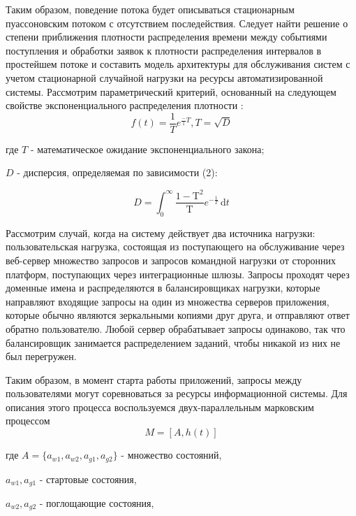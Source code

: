 Таким образом, поведение потока будет описываться стационарным пуассоновским потоком с отсутствием последействия. Следует найти решение о степени приближения плотности распределения времени между событиями поступления и обработки заявок к плотности распределения интервалов в простейшем потоке и составить модель архитектуры для обслуживания систем с учетом стационарной случайной нагрузки на ресурсы автоматизированной системы. 
Рассмотрим параметрический критерий, основанный на следующем свойстве экспоненциального распределения плотности :
\begin{equation}
    \label{eq:equation9}
    f(t) = \frac{1}{T}e^{\frac-{1}{T}}, T = \sqrt{D}
\end{equation}

где $T$ - математическое ожидание экспоненциального закона;

$D$ - дисперсия, определяемая по зависимости (2):

\begin{equation}
    \label{eq:equation10}
    D = \int_0^\infty \mathrm{\frac{{1-T}^2}{T}}{e}^{-\frac{1}{T}}\,\mathrm{d}t
\end{equation}

Рассмотрим случай, когда на систему действует два источника нагрузки: пользовательская нагрузка, состоящая из поступающего на обслуживание через веб-сервер множество запросов и запросов командной нагрузки от сторонних платформ, поступающих через интеграционные шлюзы. Запросы проходят через доменные имена и распределяются в балансировщиках нагрузки, которые направляют входящие запросы на один из множества серверов приложения, которые обычно являются зеркальными копиями друг друга, и отправляют ответ обратно пользователю. Любой сервер обрабатывает запросы одинаково, так что балансировщик занимается распределением заданий, чтобы никакой из них не был перегружен.

Таким образом, в момент старта работы приложений, запросы между пользователями могут соревноваться за ресурсы информационной системы. Для описания этого процесса воспользуемся двух-параллельным марковским процессом 
\begin{equation}
    \label{eq:equation11}
    M = [A, h(t)]
\end{equation}

где $A = \{a_{w1},a_{w2}, a_{g1},a_{g2} \}$ - множество состояний, 

$a_{w1}, a_{g1}$ - стартовые состояния, 

$a_{w2}, a_{g2}$ - поглощающие состояния, 

